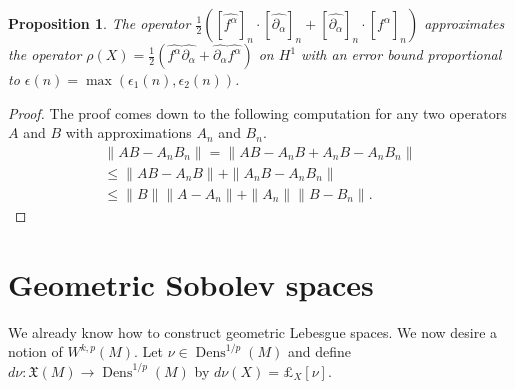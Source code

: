 \documentclass[12pt]{amsart}
\newtheorem{prop}[thm]{Proposition}
\DeclareMathOperator{\Dens}{Dens}
\begin{document}
\begin{prop}
	The operator $\frac{1}{2} ( [\widehat{f^\alpha}]_n \cdot [\widehat{\partial_\alpha}]_n + [\widehat{\partial_\alpha}]_n \cdot [\widehat{f^\alpha}]_n)$
	approximates the operator $\rho(X) = \frac{1}{2}( \widehat{f^\alpha}  \widehat{\partial_\alpha} +  \widehat{\partial_\alpha}  \widehat{f^\alpha} )$
	on $H^1$	with an error bound proportional to $\epsilon(n) = \max( \epsilon_1(n) , \epsilon_2(n) )$.
\end{prop}
\begin{proof}
	The proof comes down to the following computation for any two operators $A$ and $B$ with approximations $A_n$ and $B_n$.
	\begin{align*}
		\| AB - A_n B_n \| = \| AB - A_n B + A_n B- A_n B_n \| \\
		\leq \| AB - A_n B \| + \| A_nB - A_n B_n \| \\
		\leq \|B \| \|A - A_n \| + \|A_n \| \|B - B_n \|.
	\end{align*}
\end{proof}

\section{Geometric Sobolev spaces}
We already know how to construct geometric Lebesgue spaces.  We now desire a notion of $W^{k,p}(M)$.
Let $\nu \in \Dens^{1/p}(M)$
and define $d\nu : \mathfrak{X}(M) \to \Dens^{1/p}(M)$ by $d\nu (X) = \pounds_X[\nu]$.

\appendix
\end{document}
